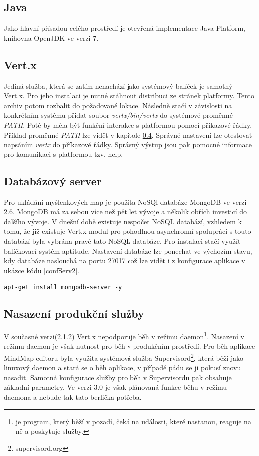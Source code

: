 \subsection{Java}

Jako hlavní přísadou celého prostředí je otevřená implementace Java Platform, knihovna OpenJDK ve verzi 7.

\subsection{Vert.x}

Jediná služba, která se zatím nenachází jako systémový balíček je samotný Vert.x. Pro jeho instalaci je nutné stáhnout distribuci ze stránek platformy. Tento archiv potom rozbalit do požadované lokace. Následně stačí v závislosti na konkrétním systému přidat soubor \emph{vertx/bin/vertx} do systémové proměnné \emph{PATH}. Poté by měla být funkční interakce s platformou pomocí příkazové řádky. Příklad proměnné \emph{PATH} lze vidět v kapitole \ref{sub:service}. Správné nastavení lze otestovat napsáním \emph{vertx} do příkazové řádky. Správný výstup jsou pak pomocné informace pro komunikaci s platformou tzv. help.

\subsection{Databázový server}

Pro ukládání myšlenkových map je použita NoSQl databáze MongoDB ve verzi 2.6. MongoDB má za sebou více než pět let vývoje a několik obřích investicí\cite{mongodb} do dalšího vývoje. V dnešní době existuje nespočet NoSQL databází, vzhledem k tomu, že již existuje Vert.x modul pro pohodlnou asynchronní spolupráci s touto databází byla vybrána pravě tato NoSQL databáze. Pro instalaci stačí využít balíčkovací systém aptitude. Nastavení databáze lze ponechat ve výchozím stavu, kdy databáze naslouchá na portu 27017 což lze vidět i z konfigurace aplikace v ukázce kódu \ref{confServ2}.

\begin{lstlisting}
apt-get install mongodb-server -y
\end{lstlisting}

\subsection{Nasazení produkční služby}\label{sub:service}

V současné verzi(2.1.2) Vert.x nepodporuje běh v režimu daemon\footnote{je program, který běží v pozadí, čeká na události, které nastanou, reaguje na ně a poskytuje služby.}. Nasazení v režimu daemon je však nutnost pro běh v produkčním prostředí. Pro běh aplikace MindMap editoru byla využita systémová služba Supervisord\footnote{supervisord.org}, která běží jako linuxový daemon a stará se o běh aplikace, v případě pádu se ji pokusí znovu nasadit. Samotná konfigurace služby pro běh v Supervisordu pak obsahuje základní parametry. Ve verzi 3.0 je však plánovaná funkce běhu v režimu daemona a nebude tak tato berlička potřeba.

